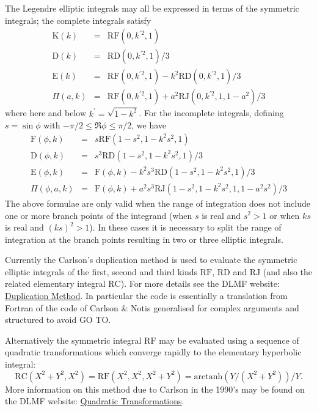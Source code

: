 The Legendre elliptic integrals may all be expressed in terms of the symmetric
integrals; the complete integrals satisfy
\begin{eqnarray*}
\mathrm{K}(k) &=& \mathrm{RF}(0,k^{\prime 2},1) \\
\mathrm{D}(k) &=& \mathrm{RD}(0,k^{\prime 2},1)/3 \\
\mathrm{E}(k) &=& \mathrm{RF}(0,k^{\prime 2},1)-k^2\mathrm{RD}(0,k^{\prime 2},1)/3\\
\Pi(a,k) &=&\mathrm{RF}(0,k^{\prime 2},1)+a^2\mathrm{RJ}(0,k^{\prime 2},1,1-a^2)/3
\end{eqnarray*}
where here and below $k^\prime=\sqrt{1-k^2}$. For the incomplete integrals,
defining $s=\sin \phi$ with $-\pi/2 \leq \Re{\phi} \leq \pi/2$, we have
\begin{eqnarray*}
\mathrm{F}(\phi,k) &=& s \mathrm{RF}(1-s^2, 1-k^2s^2, 1)\\
\mathrm{D}(\phi,k) &=& s^3 \mathrm{RD}(1-s^2, 1-k^2s^2, 1)/3\\
\mathrm{E}(\phi,k) &=&\mathrm{F}(\phi,k)-k^2s^3\mathrm{RD}(1-s^2,1-k^2s^2,1)/3\\
\Pi(\phi,a,k) &=&\mathrm{F}(\phi,k) +a^2s^3\mathrm{RJ}(1-s^2,1-k^2s^2,1,1-a^2s^2)/3
\end{eqnarray*}
The above formulae are only valid when the range of integration does not
include one or more branch points of the integrand (when $s$ is real and
$s^2>1$ or when $k s$ is real and $(k s)^2 >1$).  In these cases it is necessary
to split the range of integration at the branch points resulting in two or three
elliptic integrals.

Currently the Carlson's duplication method is used to evaluate the
symmetric elliptic integrals of the first, second and third kinds
$\mathrm{RF}$, $\mathrm{RD}$ and $\mathrm{RJ}$ (and also the related
elementary integral $\mathrm{RC}$).  For more details see the DLMF website:
\href{https://dlmf.nist.gov/19.36#i}{Duplication Method}.
In particular the \REDUCE code  is essentially a translation from
Fortran of the code of Carlson \& Notis \cite{CarlsonNotis:81} generalised
for complex arguments and structured to avoid GO TO.

Alternatively the symmetric integral $\mathrm{RF}$ may be evaluated
using a sequence of quadratic transformations
which converge rapidly to the elementary hyperbolic integral:
\[\mathrm{RC}(X^2+Y^2,X^2) = \mathrm{RF}(X^2,X^2,X^2+Y^2) = \mathrm{arctanh}
(Y/(X^2+Y^2))/Y.\]
More information on this method due to Carlson in the 1990's
may be found on the DLMF website:
\href{https://dlmf.nist.gov/19.36#ii}{Quadratic Transformations}.

